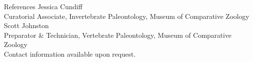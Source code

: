\documentclass{resume} %
\begin{document}
	\begin{rSection}{References}
		\normalsize Jessica Cundiff \\
		\small Curatorial Associate, Invertebrate Paleontology, Museum of Comparative Zoology \\
		
		\normalsize Scott Johnston \\
		\small Preparator \& Technician, Vertebrate Paleontology, Museum of Comparative Zoology \\
		
		Contact information available upon request.
	\end{rSection}	
\end{document}
